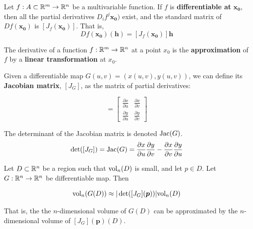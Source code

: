     \begin{theorem}
    Let  $f : A \subset \mathbb{R}^m \to \mathbb{R}^n$ be a multivariable function.  If $f$ is \textbf{differentiable at} $\bm{x_0}$, then all the partial derivatives $D_if^j\bm{x_0})$ exist, and the standard matrix of $Df(\bm{x_0})$ is $[J_f(\bm{x_0})]$.  That is,
    $$Df(\bm{x_0})(\bm{h}) = [J_f(\bm{x_0})]\bm{h}$$
    
    \end{theorem}
    
    
    
    \begin{remark}
    The derivative of a function $f : \mathbb{R}^m \to \mathbb{R}^n$ at a point $x_0$ is the \textbf{approximation} of $f$ by a \textbf{linear transformation} at $x_0$.
    \end{remark}


    \begin{example}
    Given a differentiable map $G(u,v) = \left(x(u,v), y(u,v)\right)$, we can define its \textbf{Jacobian matrix}, $[J_G]$, as the matrix of partial derivatives:
    
    \begin{equation*}
        [J_G] = \begin{bmatrix}
\frac{\partial x}{\partial u} & \frac{\partial x}{\partial v} \\[1em]
\frac{\partial y}{\partial u} & \frac{\partial y}{\partial v}
\end{bmatrix}
    \end{equation*}
    
    The determinant of the Jacobian matrix is denoted $\textnormal{Jac}(G)$.
    $$\det([J_G]) = \textnormal{Jac}(G) = \frac{\partial x}{\partial u} \frac{\partial y}{\partial v} - \frac{\partial x}{\partial v}\frac{\partial y}{\partial u}$$
       
    \end{example}


\begin{proposition}
    Let $D \subset \mathbb{R}^n$ be a region such that $\textnormal{vol}_n(D)$ is small, and let $p \in D$.  Let $G: \mathbb{R}^n \to \mathbb{R}^n$ be differentiable map. Then

    $$\textnormal{vol}_n(G(D)) \approx |\det([J_G](\bm{p}))|\textnormal{vol}_n(D)$$

    That is, the the $n$-dimensional volume of $G(D)$ can be approximated by the $n$-dimensional volume of $[J_G](\bm{p})(D)$.
    \end{proposition}

